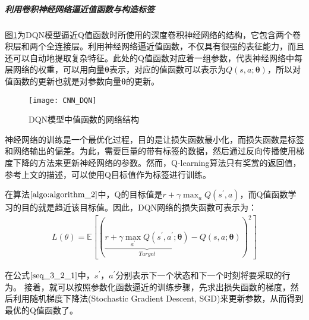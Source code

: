 
 \subparagraph{利用卷积神经网络逼近值函数与构造标签}
图\ref{fig:CNN_DQN}为DQN模型逼近Q值函数时所使用的深度卷积神经网络的结构，它包含两个卷积层和两个全连接层。利用神经网络逼近值函数，不仅具有很强的表征能力，而且还可以自动地提取复杂特征。此处的Q值函数对应着一组参数，代表神经网络中每层网络的权重，可以用向量$\bm{\theta}$表示，对应的值函数可以表示为$Q(s,a;\bm{\theta})$，所以对值函数的更新也就是对参数向量$\bm{\theta}$的更新。
\begin{figure}[htbp]
\centering
\texttt{[image: CNN\_DQN]}
\caption{DQN模型中值函数的网络结构}
\label{fig:CNN_DQN}
\end{figure}

神经网络的训练是一个最优化过程，目的是让损失函数最小化，而损失函数是标签和网络输出的偏差。为此，需要巨量的带有标签的数据，然后通过反向传播使用梯度下降的方法来更新神经网络的参数。然而，Q-learning算法只有奖赏的返回值，参考上文的描述，可以使用Q目标值作为标签进行训练。

在算法$\ref{algo:algorithm_2}$中，Q的目标值是$r+\gamma \max_{a}Q(s^{'},a)$，而Q值函数学习的目的就是趋近该目标值。因此，DQN网络的损失函数可表示为：
\begin{equation}
\label{seq_3_2_1}
\begin{aligned}
L(\theta)=\mathbb{E}[(\underbrace{r+\gamma\max_{a^{'}} Q(s^{'},a^{'};\bm{\theta})}_{Target}-Q(s,a;\bm{\theta}))^{2}]
\end{aligned}
\end{equation}

在公式$\eqref{seq_3_2_1}$中，$s^{'}$，$a^{'}$分别表示下一个状态和下一个时刻将要采取的行为。
接着，就可以按照参数化函数逼近的训练步骤，先求出损失函数的梯度，然后利用随机梯度下降法(Stochastic Gradient Descent, SGD)来更新参数，从而得到最优的Q值函数了。

